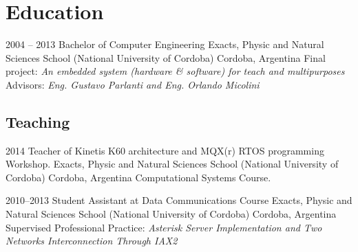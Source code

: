 
\section{Education}

\cventry
    {2004 -- 2013}
    {Bachelor of Computer Engineering}
    {Exacts, Physic and Natural Sciences School (National University of Cordoba)}
    {Cordoba, Argentina}
    {Final project: \emph{An embedded system (hardware \& software) for teach and multipurposes}}
    {Advisors: \emph{Eng. Gustavo Parlanti and Eng. Orlando Micolini}}

\subsection{Teaching}

\cventry
    {2014} %
    {Teacher of Kinetis K60 architecture and MQX(r) RTOS programming Workshop.}
    {Exacts, Physic and Natural Sciences School (National University of Cordoba)} %
    {Cordoba, Argentina} %
    {}
    {Computational Systems Course.}

  \cventry
    {2010--2013}
    {Student Assistant at Data Communications Course}
    {Exacts, Physic and Natural Sciences School (National University of Cordoba)} %
    {Cordoba, Argentina}
    {}
    {Supervised Professional Practice: \emph{Asterisk Server Implementation and Two Networks Interconnection Through IAX2}}

